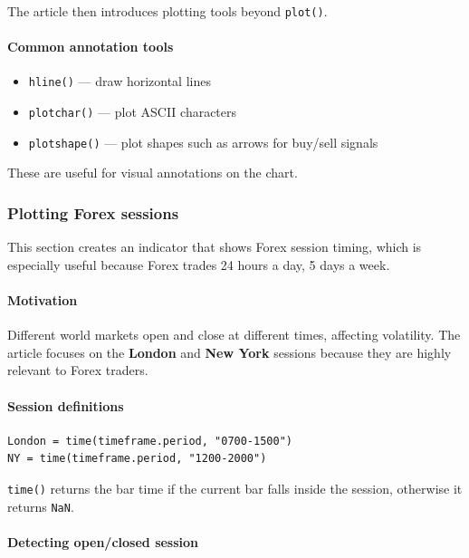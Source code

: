 \documentclass[12pt,openany]{book}
\begin{document}
The article then introduces plotting tools beyond \texttt{plot()}.

\paragraph{Common annotation tools}

\begin{itemize}[leftmargin=*]
    \item \texttt{hline()} --- draw horizontal lines
    \item \texttt{plotchar()} --- plot ASCII characters
    \item \texttt{plotshape()} --- plot shapes such as arrows for buy/sell signals
\end{itemize}

These are useful for visual annotations on the chart.

\subsubsection{Plotting Forex sessions}

This section creates an indicator that shows Forex session timing, which is especially useful because Forex trades 24 hours a day, 5 days a week.

\paragraph{Motivation}

Different world markets open and close at different times, affecting volatility. The article focuses on the \textbf{London} and \textbf{New York} sessions because they are highly relevant to Forex traders.

\paragraph{Session definitions}

\begin{Verbatim}[breaklines=true,breakanywhere=true,fontsize=\small]
London = time(timeframe.period, "0700-1500")
NY = time(timeframe.period, "1200-2000")
\end{Verbatim}

\texttt{time()} returns the bar time if the current bar falls inside the session, otherwise it returns \texttt{NaN}.

\paragraph{Detecting open/closed session}
\end{document}
